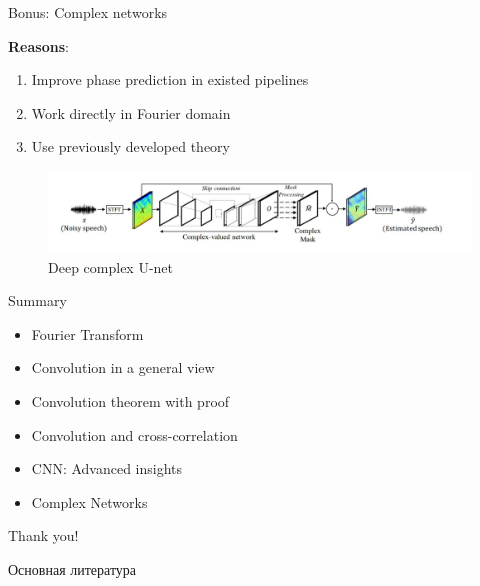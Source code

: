 \documentclass[10pt]{beamer}
\begin{document}
\begin{frame}{Bonus: Complex networks}

\textbf{Reasons}:

\begin{enumerate}
    \item Improve phase prediction in existed pipelines 
    \item Work directly in Fourier domain
    \item Use previously developed theory
\end{enumerate}

\begin{figure}
    \centering
    \includegraphics[width=\textwidth]{complex.jpg}
    \caption{Deep complex U-net}
    \label{fig:my_label}
\end{figure}

\end{frame}

\begin{frame}{Summary}
\begin{itemize}
    \item Fourier Transform
    \item Convolution in a general view
    \item Convolution theorem with proof
    \item Convolution and cross-correlation
    \item CNN: Advanced insights
    \item Complex Networks
\end{itemize}
\end{frame}




\begin{frame}
\centering
\Large{Thank you!}
\end{frame}



{\small
\begin{frame}[allowframebreaks]{Основная литература}
    
    \nocite{*}
        
\end{frame}
}
\end{document}
